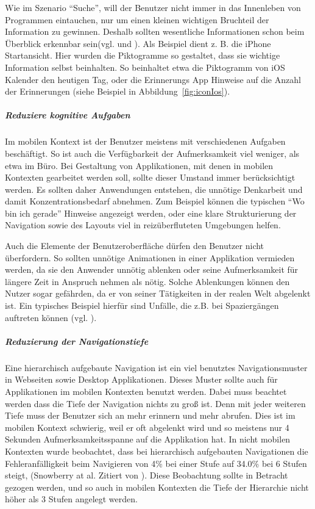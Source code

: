 Wie im Szenario “Suche”, will der Benutzer nicht immer in das Innenleben von Programmen eintauchen, nur um einen kleinen wichtigen Bruchteil der Information zu gewinnen. Deshalb sollten wesentliche Informationen schon beim Überblick erkennbar sein(vgl. \cite[Seite 54]{mobileFrontier} und \cite{Neil:2012uf}). Als Beispiel dient z. B. die iPhone Startansicht. Hier wurden die Piktogramme so gestaltet, dass sie wichtige Information selbst beinhalten. So beinhaltet etwa die Piktogramm von iOS Kalender den heutigen Tag, oder die Erinnerungs App Hinweise auf die Anzahl der Erinnerungen (siehe Beispiel in Abbildung~\ref{fig:iconIos}).


\subparagraph{Reduziere kognitive Aufgaben} 
\label{subp:reduziere_kognitive_aufgaben_}

Im mobilen Kontext ist der Benutzer meistens mit verschiedenen Aufgaben beschäftigt. So ist auch die Verfügbarkeit der Aufmerksamkeit viel weniger, als etwa im Büro. Bei Gestaltung von Applikationen, mit denen in mobilen Kontexten gearbeitet werden soll, sollte dieser Umstand immer berücksichtigt werden. Es sollten daher Anwendungen entstehen, die unnötige Denkarbeit und damit Konzentrationsbedarf abnehmen. Zum Beispiel können die typischen “Wo bin ich gerade” Hinweise angezeigt werden, oder eine klare Strukturierung der Navigation sowie des Layouts viel in reizüberfluteten Umgebungen helfen. 

Auch die Elemente der Benutzeroberfläche dürfen den Benutzer nicht überfordern. So sollten unnötige Animationen in einer Applikation vermieden werden, da sie den Anwender unnötig ablenken oder seine Aufmerksamkeit für längere Zeit in Anspruch nehmen als nötig. Solche Ablenkungen können den Nutzer sogar gefährden, da er von seiner Tätigkeiten in der realen Welt abgelenkt ist. Ein typisches Beispiel hierfür sind Unfälle, die z.B. bei Spaziergängen auftreten können (vgl. \cite{Nasar:2008cc}).

\subparagraph{Reduzierung der Navigationstiefe} 
\label{subp:reduziere_das_w_hlen}

Eine hierarchisch aufgebaute Navigation ist ein viel benutztes Navigationsmuster in Webseiten sowie Desktop Applikationen. Dieses Muster sollte auch für Applikationen im mobilen Kontexten benutzt werden. Dabei muss beachtet werden dass die Tiefe der Navigation nichts zu groß ist. Denn mit jeder weiteren Tiefe muss der Benutzer sich an mehr erinnern und mehr abrufen. Dies ist im mobilen Kontext schwierig, weil er oft abgelenkt wird und so meistens nur 4 Sekunden Aufmerksamkeitsspanne auf die Applikation hat\cite{Oulasvirta:2005vn}. In nicht mobilen Kontexten wurde beobachtet, dass bei hierarchisch aufgebauten Navigationen die Fehleranfälligkeit beim Navigieren von 4\% bei einer Stufe auf 34.0\% bei 6 Stufen steigt, (Snowberry at al. Zitiert von \cite{Chae:2004gp}). Diese Beobachtung sollte in Betracht gezogen werden, und so auch in mobilen Kontexten die Tiefe der Hierarchie nicht höher als 3 Stufen angelegt werden.

